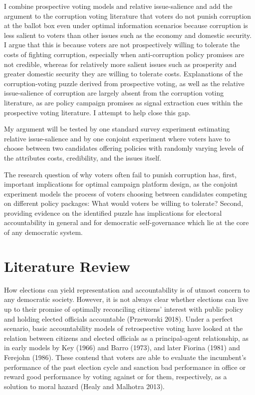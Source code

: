 \documentclass[11pt]{article}
\begin{document}
I combine prospective voting models and relative issue-salience and add the argument to the corruption voting literature that voters do not punish corruption at the ballot box even under optimal information scenarios because corruption is less salient to voters than other issues such as the economy and domestic security. I argue that this is because voters are not prospectively willing to tolerate the costs of fighting corruption, especially when anti-corruption policy promises are not credible, whereas for relatively more salient issues such as prosperity and greater domestic security they are willing to tolerate costs. Explanations of the corruption-voting puzzle derived from prospective voting, as well as the relative issue-salience of corruption are largely absent from the corruption voting literature, as are policy campaign promises as signal extraction cues within the prospective voting literature. I attempt to help close this gap.

My argument will be tested by one standard survey experiment estimating relative issue-salience and by one conjoint experiment where voters have to choose between two candidates offering policies with randomly varying levels of the attributes costs, credibility, and the issues itself.

The research question of why voters often fail to punish corruption has, first, important implications for optimal campaign platform design, as the conjoint experiment models the process of voters choosing between candidates competing on different policy packages: What would voters be willing to tolerate? Second, providing evidence on the identified puzzle has implications for electoral accountability in general and for democratic self-governance which lie at the core of any democratic system.

\newpage
\section{Literature Review}
How elections can yield representation and accountability is of utmost concern to any democratic society. However, it is not always clear whether elections can live up to their promise of optimally reconciling citizens' interest with public policy and holding elected officials accountable (Przeworski 2018). Under a perfect scenario, basic accountability models of retrospective voting have looked at the relation between citizens and elected officials as a principal-agent relationship, as in early models by Key (1966) and Barro (1973), and later Fiorina (1981) and Ferejohn (1986). These contend that voters are able to evaluate the incumbent's performance of the past election cycle and sanction bad performance in office or reward good performance by voting against or for them, respectively, as a solution to moral hazard (Healy and Malhotra 2013).
\end{document}

